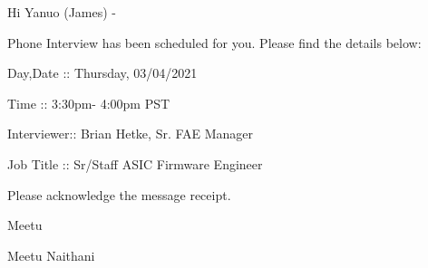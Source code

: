 \par \smallbreak       %
\par Hi Yanuo (James) -
\par Phone Interview has been scheduled for you. Please find the details below:
\par \smallbreak       %
\par Day,Date :: Thursday, 03/04/2021
\par Time :: 3:30pm- 4:00pm PST
\par Interviewer:: Brian Hetke, Sr. FAE Manager
\par Job Title :: Sr/Staff ASIC Firmware Engineer
\par \smallbreak       %
\par \smallbreak       %
\par Please acknowledge the message receipt.
\par \smallbreak       %
\par Meetu
\par \smallbreak       %
\par \smallbreak       %
\par Meetu Naithani
\vfil

\bye
